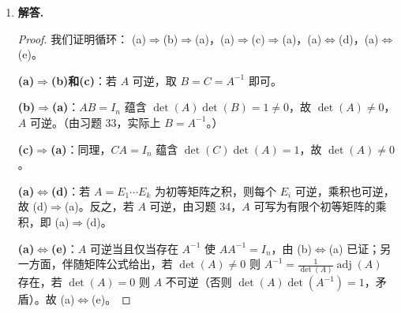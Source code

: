 \begin{enumerate}[label=\textbf{\arabic*.}, leftmargin=*, itemsep=1em]
  \item \textbf{解答.}
  \begin{proof}
  我们证明循环：
  (a)$\Rightarrow$(b)$\Rightarrow$(a)，(a)$\Rightarrow$(c)$\Rightarrow$(a)，(a)$\Leftrightarrow$(d)，(a)$\Leftrightarrow$(e)。

  \textbf{(a)$\Rightarrow$(b)和(c)}：若 $A$ 可逆，取 $B=C=A^{-1}$ 即可。

  \textbf{(b)$\Rightarrow$(a)}：$AB=I_n$ 蕴含 $\det(A)\det(B)=1\ne0$，故 $\det(A)\ne0$，$A$ 可逆。（由习题 33，实际上 $B=A^{-1}$。）

  \textbf{(c)$\Rightarrow$(a)}：同理，$CA=I_n$ 蕴含 $\det(C)\det(A)=1$，故 $\det(A)\ne0$。

  \textbf{(a)$\Leftrightarrow$(d)}：若 $A=E_1\cdots E_k$ 为初等矩阵之积，则每个 $E_i$ 可逆，乘积也可逆，故 (d)$\Rightarrow$(a)。反之，若 $A$ 可逆，由习题 34，$A$ 可写为有限个初等矩阵的乘积，即 (a)$\Rightarrow$(d)。

  \textbf{(a)$\Leftrightarrow$(e)}：$A$ 可逆当且仅当存在 $A^{-1}$ 使 $AA^{-1}=I_n$，由 (b)$\Leftrightarrow$(a) 已证；另一方面，伴随矩阵公式给出，若 $\det(A)\ne0$ 则 $A^{-1}=\frac{1}{\det(A)}\operatorname{adj}(A)$ 存在，若 $\det(A)=0$ 则 $A$ 不可逆（否则 $\det(A)\det(A^{-1})=1$，矛盾）。故 (a)$\Leftrightarrow$(e)。
  \end{proof}

\end{enumerate}
